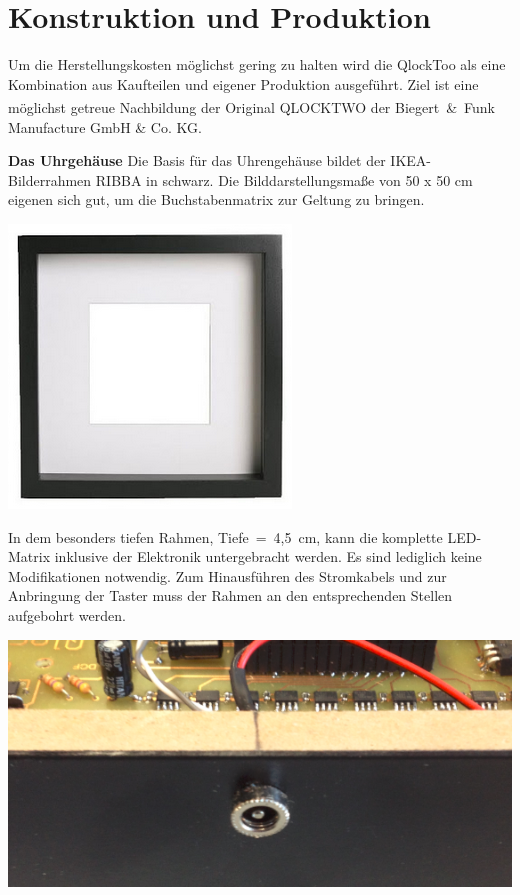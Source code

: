 
\section{Konstruktion und Produktion}
\label{sec:KonstruktionFertigung}

\begin{multicols}{2}
Um die Herstellungskosten möglichst gering zu halten wird die QlockToo als eine Kombination aus Kaufteilen und eigener Produktion ausgeführt. Ziel ist eine möglichst getreue Nachbildung der Original QLOCKTWO\textsuperscript{\textregistered} der Biegert~\&~Funk Manufacture GmbH \& Co. KG.

\textbf{Das Uhrgehäuse} Die Basis für das Uhrengehäuse bildet der IKEA-Bilderrahmen RIBBA in schwarz. Die Bilddarstellungsmaße von 50 x 50 cm eigenen sich gut, um die Buchstabenmatrix zur Geltung zu bringen.

{
\centering
\includegraphics[width=0.75\columnwidth]{Abbildungen/Konstruktion/Ribba02} %

}
In dem besonders tiefen Rahmen,  Tiefe~=~4,5~cm, kann die komplette LED-Matrix inklusive der Elektronik untergebracht werden. Es sind lediglich keine Modifikationen notwendig.
Zum Hinausführen des Stromkabels und zur Anbringung der Taster muss der Rahmen an den entsprechenden Stellen aufgebohrt werden.

{
\centering
\includegraphics[width=0.6\columnwidth]{Abbildungen/Konstruktion/Stecker01}

}
\end{multicols}
